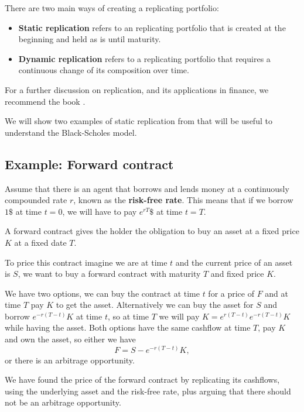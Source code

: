 There are two main ways of creating a replicating portfolio:
\begin{itemize}
    \item \textbf{Static replication} refers to an replicating portfolio that is created at the beginning and held as is until maturity. 
    \item \textbf{Dynamic replication} refers to a replicating portfolio that requires a continuous change of its composition over time.
\end{itemize}

For a further discussion on replication, and its applications in finance, we recommend the book \cite{derman_vol_smile}.


We will show two examples of static replication from \cite{steele_stochastic}
that will be useful to understand the Black-Scholes model.

\subsection{Example: Forward contract}

Assume that there is an agent that borrows and lends money at a continuously compounded rate $r$, known as the \textbf{risk-free rate}.
This means that if we borrow $1 \$$ at time $t = 0$,
we will have to pay $e^{rT} \$$ at time $t = T$.

A forward contract gives the holder the obligation to buy an asset at a fixed price $K$ at a fixed date $T$.

To price this contract imagine we are at time $t$ and the current price of an asset is $S$,
we want to buy a forward contract with maturity $T$ and fixed price $K$.

We have two options, we can buy the contract at time $t$ for a price of $F$ and at time $T$ pay $K$ to get the asset.
Alternatively we can buy the asset for $S$ and borrow $e^{-r(T - t)}K$ at time $t$, so at time $T$ we will pay $K = e^{r(T - t)} e^{-r(T - t)} K$ while having the asset.
Both options have the same cashflow at time $T$, pay $K$ and own the asset,
so either we have
\begin{equation*}
    F = S - e^{-r(T - t)} K,
\end{equation*}
or there is an arbitrage opportunity.

We have found the price of the forward contract by replicating its cashflows, using the underlying asset and the risk-free rate,
plus arguing that there should not be an arbitrage opportunity.

